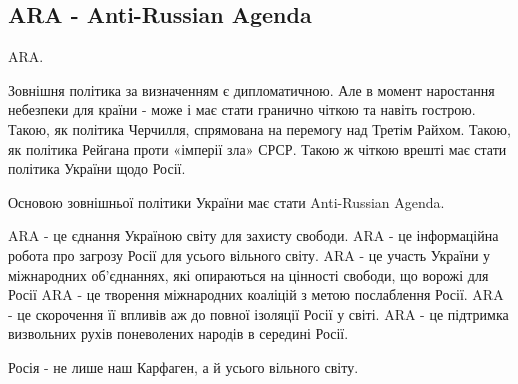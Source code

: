  
 
 
 
 
\subsection{ARA - Anti-Russian Agenda}
\label{sec:09_04_2021.fb.vjatrovich_vladimir.2.anti_russian_agenda}

ARA.

Зовнішня політика за визначенням є дипломатичною. Але в момент наростання
небезпеки для країни - може і має стати гранично чіткою та навіть гострою.
Такою, як політика Черчилля, спрямована на перемогу над Третім Райхом. Такою,
як політика Рейгана проти «імперії зла» СРСР. Такою ж чіткою врешті має стати
політика України щодо Росії. 

Основою зовнішньої політики України має стати Anti-Russian Agenda.  

ARA - це єднання Україною світу для захисту свободи. 
ARA - це інформаційна робота про загрозу Росії для усього вільного світу. 
ARA - це участь України у міжнародних об’єднаннях, які опираються на цінності свободи, що ворожі для Росії
ARA - це творення міжнародних коаліцій з метою послаблення Росії. 
ARA - це скорочення її впливів аж до повної ізоляції Росії у світі. 
ARA - це підтримка визвольних рухів поневолених народів в середині Росії. 

Росія - не лише наш Карфаген, а й усього вільного світу.
